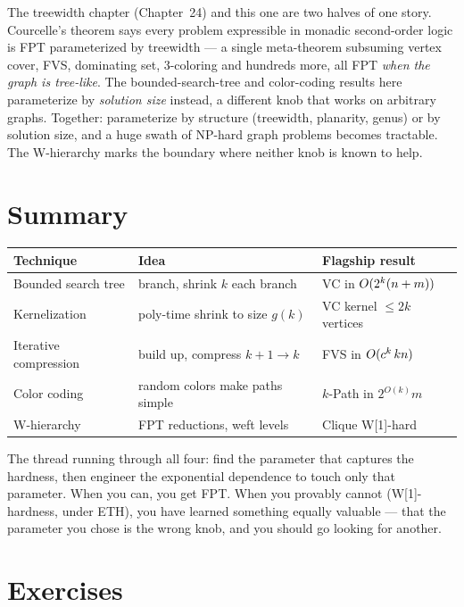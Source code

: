 \begin{connectionbox}
The treewidth chapter (Chapter~24) and this one are two halves of one story. Courcelle's theorem says every problem expressible in monadic second-order logic is FPT parameterized by treewidth --- a single meta-theorem subsuming vertex cover, FVS, dominating set, $3$-coloring and hundreds more, all FPT \emph{when the graph is tree-like}. The bounded-search-tree and color-coding results here parameterize by \emph{solution size} instead, a different knob that works on arbitrary graphs. Together: parameterize by structure (treewidth, planarity, genus) or by solution size, and a huge swath of NP-hard graph problems becomes tractable. The W-hierarchy marks the boundary where neither knob is known to help.
\end{connectionbox}

\section*{Summary}

\begin{center}
\begin{tabular}{lll}
\toprule
Technique & Idea & Flagship result \\
\midrule
Bounded search tree & branch, shrink $k$ each branch & VC in $O(2^k(n+m))$ \\
Kernelization & poly-time shrink to size $g(k)$ & VC kernel $\le 2k$ vertices \\
Iterative compression & build up, compress $k{+}1\!\to\!k$ & FVS in $O(c^k\,kn)$ \\
Color coding & random colors make paths simple & $k$-Path in $2^{O(k)}m$ \\
W-hierarchy & FPT reductions, weft levels & Clique W[1]-hard \\
\bottomrule
\end{tabular}
\end{center}

The thread running through all four: find the parameter that captures the hardness, then engineer the exponential dependence to touch only that parameter. When you can, you get FPT. When you provably cannot (W[1]-hardness, under ETH), you have learned something equally valuable --- that the parameter you chose is the wrong knob, and you should go looking for another.

\section{Exercises}

